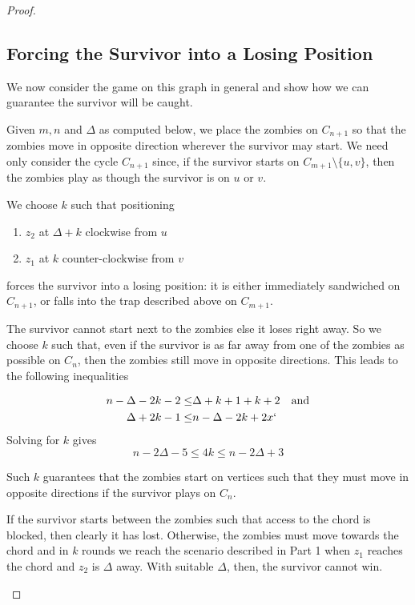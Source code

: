 \begin{proof}
\begin{proofpart}
 \end{proofpart}

\subsection{Forcing the Survivor into a Losing Position}
 \begin{proofpart}
  We now consider the game on this graph in general and show
  how we can guarantee the survivor will be caught.

  Given $m, n$ and $\Delta$ as computed below, we place the
  zombies on $C_{n+1}$ so that the zombies move in
  opposite direction wherever the survivor may start.
  We need only consider the cycle $C_{n+1}$ since, if the survivor
  starts on $C_{m+1} \setminus \{u, v\}$, then the zombies play as
  though the survivor is on $u$ or $v$.

  We choose $k$ such that positioning
  \begin{enumerate}
   \item $z_2$ at $\Delta + k$ clockwise from $u$
   \item $z_1$ at $k$ counter-clockwise from $v$
  \end{enumerate}
  forces the survivor into a losing position: it is either immediately sandwiched on $C_{n+1}$,
  or falls into the trap described above on $C_{m+1}$.

  The survivor cannot start next to the zombies else it loses right away.
  So we choose $k$ such that, even if the survivor is as far
  away from one of the zombies as possible on $C_n$, then the zombies
  still move in opposite directions. This leads to the following inequalities

  \begin{align*}
   n - \Delta - 2k - 2 \leq & \Delta + k +1 + k +2 & \text{and} \\
   \Delta + 2k -1 \leq      & n - \Delta -2k +2x`
  \end{align*}
  Solving for $k$ gives
  \[ n - 2\Delta -5 \leq 4k \leq n-2\Delta +3 \]

  Such $k$ guarantees that the zombies start on vertices such that they must
  move in opposite directions if the survivor plays on $C_n$.

  If the survivor starts between the zombies such that
  access to the chord is blocked, then clearly it has lost. Otherwise,
   the zombies must move towards the chord and in $k$ rounds we reach the
    scenario described in Part 1 when $z_1$ reaches the chord and $z_2$ is
    $\Delta$ away. With suitable $\Delta$, then, the survivor cannot win.
 \end{proofpart}


\end{proof}
